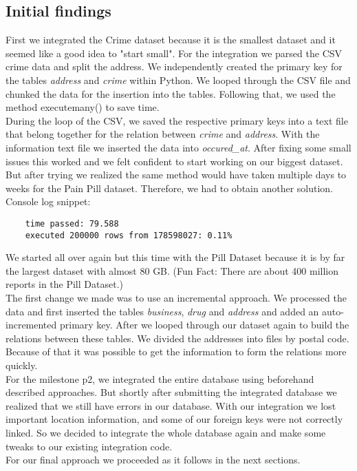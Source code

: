 \subsection*{Initial findings}
First we integrated the Crime dataset because it is the smallest dataset and it seemed like a good idea to "start small". For the integration we parsed the CSV crime data and split the address. We independently created the primary key for the tables \textit{address} and \textit{crime} within Python. We looped through the CSV file and chunked the data for the insertion into the tables. Following that, we used the method executemany() to save time.\\
During the loop of the CSV, we saved the respective primary keys into a text file that belong together for the relation between \textit{crime} and \textit{address}. With the information text file we inserted the data into \textit{occured\_at}. After fixing some small issues this worked and we felt confident to start working on our biggest dataset.\\
But after trying we realized the same method would have taken multiple days to weeks for the Pain Pill dataset. Therefore, we had to obtain another solution.\\
Console log snippet:
\begin{lstlisting}
    time passed: 79.588
    executed 200000 rows from 178598027: 0.11%
\end{lstlisting}
\smallskip
We started all over again but this time with the Pill Dataset because it is by far the largest dataset with almost 80 GB. (Fun Fact: There are about 400 million reports in the Pill Dataset.)\\
The first change we made was to use an incremental approach. We processed the data and first inserted the tables \textit{business}, \textit{drug} and \textit{address} and added an auto-incremented primary key. After we looped through our dataset again to build the relations between these tables. We divided the addresses into files by postal code. Because of that it was possible to get the information to form the relations more quickly.\\
For the milestone p2, we integrated the entire database using beforehand described approaches. But shortly after submitting the integrated database we realized that we still have errors in our database. With our integration we lost important location information, and some of our foreign keys were not correctly linked. So we decided to integrate the whole database again and make some tweaks to our existing integration code.\\
For our final approach we proceeded as it follows in the next sections.

